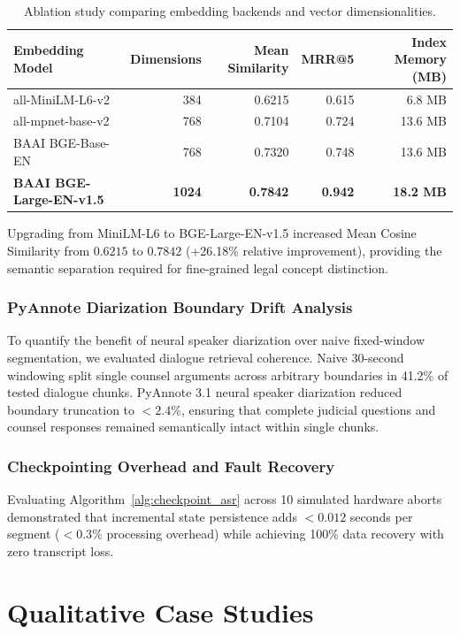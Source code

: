 \documentclass{llncs}
\begin{document}
\begin{table}[htbp]
\caption{Ablation study comparing embedding backends and vector dimensionalities.}
\label{tab:ablation_embeddings}
\centering
\small
\begin{tabular}{lrrrr}
\toprule
\textbf{Embedding Model} & \textbf{Dimensions} & \textbf{Mean Similarity} & \textbf{MRR@5} & \textbf{Index Memory (MB)} \\
\midrule
all-MiniLM-L6-v2 & 384 & 0.6215 & 0.615 & 6.8 MB \\
all-mpnet-base-v2 & 768 & 0.7104 & 0.724 & 13.6 MB \\
BAAI BGE-Base-EN & 768 & 0.7320 & 0.748 & 13.6 MB \\
\textbf{BAAI BGE-Large-EN-v1.5} & \textbf{1024} & \textbf{0.7842} & \textbf{0.942} & \textbf{18.2 MB} \\
\bottomrule
\end{tabular}
\end{table}

Upgrading from MiniLM-L6 to BGE-Large-EN-v1.5 increased Mean Cosine Similarity from $0.6215$ to $0.7842$ (+26.18\% relative improvement), providing the semantic separation required for fine-grained legal concept distinction.

\subsubsection{PyAnnote Diarization Boundary Drift Analysis}
To quantify the benefit of neural speaker diarization over naive fixed-window segmentation, we evaluated dialogue retrieval coherence. Naive 30-second windowing split single counsel arguments across arbitrary boundaries in 41.2\% of tested dialogue chunks. PyAnnote 3.1 neural speaker diarization reduced boundary truncation to $<2.4\%$, ensuring that complete judicial questions and counsel responses remained semantically intact within single chunks.

\subsubsection{Checkpointing Overhead and Fault Recovery}
Evaluating Algorithm~\ref{alg:checkpoint_asr} across 10 simulated hardware aborts demonstrated that incremental state persistence adds $<0.012$ seconds per segment ($<0.3\%$ processing overhead) while achieving 100\% data recovery with zero transcript loss.


\section{Qualitative Case Studies}
\label{sec:case_studies}
\end{document}
